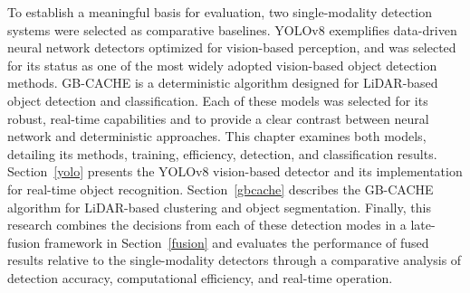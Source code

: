 \documentclass{erauthesis}
\begin{document}
To establish a meaningful basis for evaluation, two single-modality detection systems were selected as comparative baselines.
YOLOv8 exemplifies data-driven neural network detectors optimized for vision-based perception, and was selected for its status as one of the most widely adopted vision-based object detection methods.
GB-CACHE is a deterministic algorithm designed for LiDAR-based object detection and classification.
Each of these models was selected for its robust, real-time capabilities and to provide a clear contrast between neural network and deterministic approaches. 
This chapter examines both models, detailing its methods, training, efficiency, detection, and classification results.
Section~\ref{yolo} presents the YOLOv8 vision-based detector and its implementation for real-time object recognition.
Section~\ref{gbcache} describes the GB-CACHE algorithm for LiDAR-based clustering and object segmentation.
Finally, this research combines the decisions from each of these detection modes in a late-fusion framework in Section~\ref{fusion} and evaluates the performance of fused results relative to the single-modality detectors through a comparative analysis of detection accuracy, computational efficiency, and real-time operation.
\end{document}
